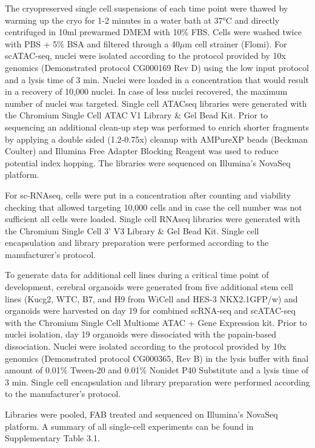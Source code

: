 The cryopreserved single cell suspensions of each time point were thawed by warming up the cryo for 1-2 minutes in a water bath at 37°C and directly centrifuged in 10ml prewarmed DMEM with 10\% FBS. Cells were washed twice with PBS + 5\% BSA and filtered through a 40$\mu$m cell strainer (Flomi). For scATAC-seq, nuclei were isolated according to the protocol provided by 10x genomics (Demonstrated protocol CG000169 Rev D) using the low input protocol and a lysis time of 3 min. Nuclei were loaded in a concentration that would result in a recovery of 10,000 nuclei. In case of less nuclei recovered, the maximum number of nuclei was targeted. Single cell ATACseq libraries were generated with the Chromium Single Cell ATAC V1 Library \& Gel Bead Kit. Prior to sequencing an additional clean-up step was performed to enrich shorter fragments by applying a double sided (1.2-0.75x) cleanup with AMPureXP beads (Beckman Coulter) and Illumina Free Adapter Blocking Reagent was used to reduce potential index hopping. The libraries were sequenced on Illumina's NovaSeq platform.

For sc-RNAseq, cells were put in a concentration after counting and viability checking that allowed targeting 10,000 cells and in case the cell number was not sufficient all cells were loaded. Single cell RNAseq libraries were generated with the Chromium Single Cell 3' V3 Library \& Gel Bead Kit. Single cell encapsulation and library preparation were performed according to the manufacturer's protocol.

To generate data for additional cell lines during a critical time point of development, cerebral organoids were generated from five additional stem cell lines (Kucg2, WTC, B7, and H9 from WiCell and HES-3 NKX2.1GFP/w) and organoids were harvested on day 19 for combined scRNA-seq and scATAC-seq with the Chromium Single Cell Multiome ATAC + Gene Expression kit. Prior to nuclei isolation, day 19 organoids were dissociated with the papain-based dissociation. Nuclei were isolated according to the protocol provided by 10x genomics (Demonstrated protocol CG000365, Rev B) in the lysis buffer with final amount of 0.01\% Tween-20 and 0.01\% Nonidet P40 Substitute and a lysis time of 3 min. Single cell encapsulation and library preparation were performed according to the manufacturer's protocol.

Libraries were pooled, FAB treated and sequenced on Illumina's NovaSeq platform. A summary of all single-cell experiments can be found in Supplementary Table 3.1. 
 
